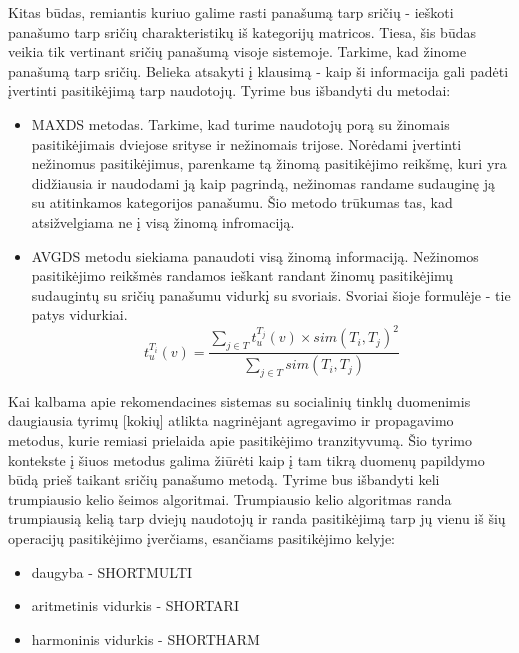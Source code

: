 \documentclass{VUMIFInfMagistrinis}
\begin{document}
\newline
\indent Kitas būdas, remiantis kuriuo galime rasti panašumą tarp sričių - ieškoti panašumo tarp sričių charakteristikų iš kategorijų matricos. Tiesa, šis būdas veikia tik vertinant sričių panašumą visoje sistemoje.
\newline
\indent 
Tarkime, kad žinome panašumą tarp sričių. Belieka atsakyti į klausimą - kaip ši informacija gali padėti įvertinti pasitikėjimą tarp naudotojų. Tyrime bus išbandyti du metodai:
\begin{itemize}
	\item MAXDS metodas. Tarkime, kad turime naudotojų porą su žinomais pasitikėjimais dviejose srityse ir nežinomais trijose. Norėdami įvertinti nežinomus pasitikėjimus, parenkame tą žinomą pasitikėjimo reikšmę, kuri yra didžiausia ir naudodami ją kaip pagrindą, nežinomas randame sudauginę ją su atitinkamos kategorijos panašumu. Šio metodo trūkumas tas, kad atsižvelgiama ne į visą žinomą infromaciją. 
	\item AVGDS metodu siekiama panaudoti visą žinomą informaciją. Nežinomos pasitikėjimo reikšmės randamos ieškant randant žinomų pasitikėjimų sudaugintų su sričių panašumu vidurkį su svoriais. Svoriai šioje formulėje - tie patys vidurkiai.
	\begin{equation}
		t_u^{T_i}(v) = \frac{\sum\limits_{j \in T } t_u^{T_j}(v) \times sim(T_i, T_j)^2}{\sum\limits_{j \in T} sim(T_i, T_j)}
	\end{equation}
\end{itemize}

\indent
Kai kalbama apie rekomendacines sistemas su socialinių tinklų duomenimis daugiausia tyrimų [kokių] atlikta nagrinėjant agregavimo ir propagavimo metodus, kurie remiasi prielaida apie pasitikėjimo tranzityvumą. Šio tyrimo kontekste į šiuos metodus galima žiūrėti kaip į tam tikrą duomenų papildymo būdą prieš taikant sričių panašumo metodą. 
\indent 
Tyrime bus išbandyti keli trumpiausio kelio šeimos algoritmai. Trumpiausio kelio algoritmas randa trumpiausią kelią tarp dviejų naudotojų ir randa pasitikėjimą tarp jų vienu iš šių operacijų pasitikėjimo įverčiams, esančiams pasitikėjimo kelyje:

	\begin{itemize}
		\item daugyba - SHORTMULTI
		\item aritmetinis vidurkis - SHORTARI
		\item harmoninis vidurkis - SHORTHARM
	\end{itemize}
\end{document}
